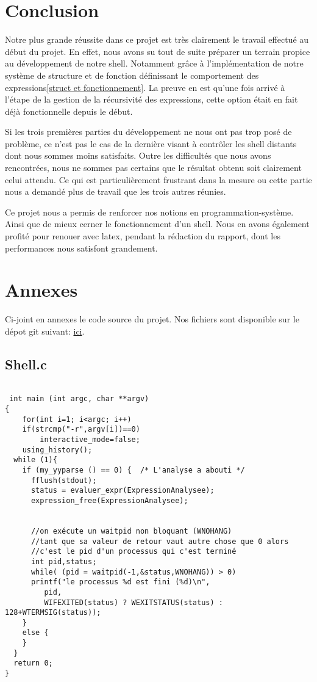 \documentclass[12pt]{article}
\begin{document}
\newpage
\section{Conclusion}

Notre plus grande réussite dans ce projet est très clairement le travail effectué au
début du projet. En effet, nous avons su tout de suite préparer un terrain propice au
développement de notre shell. Notamment grâce à l'implémentation de notre système de structure et 
de fonction définissant le comportement des expressions\ref{struct et fonctionnement}.
La preuve en est qu'une fois arrivé à l'étape de la gestion de la récursivité des expressions, 
cette option était en fait déjà fonctionnelle depuis le début.\newline

Si les trois premières parties du développement ne nous ont pas trop posé de problème, ce n'est pas le cas de la dernière visant à contrôler les shell distants dont nous sommes moins satisfaits. Outre les difficultés que nous avons rencontrées, nous ne sommes pas certains que le résultat obtenu soit clairement celui attendu. Ce qui est particulièrement frustrant dans la mesure ou cette partie nous a demandé plus de travail que les trois autres réunies.\newline

Ce projet nous a permis de renforcer nos notions en programmation-système. Ainsi que de mieux cerner le fonctionnement d'un shell. Nous en avons également profité pour renouer avec latex, pendant la rédaction du rapport, dont les performances nous satisfont grandement.


\newpage
\section{Annexes}

Ci-joint en annexes le code source du projet. Nos fichiers sont disponible sur le dépot git suivant:
 \href{https://github.com/beziarum/shell.git}{ici}.

 \scriptsize
\subsection{Shell.c}
\label{main}
\begin{verbatim}

 int main (int argc, char **argv)
{
    for(int i=1; i<argc; i++)
	if(strcmp("-r",argv[i])==0)
	    interactive_mode=false;
    using_history();
  while (1){
    if (my_yyparse () == 0) {  /* L'analyse a abouti */
      fflush(stdout);
      status = evaluer_expr(ExpressionAnalysee);
      expression_free(ExpressionAnalysee);


      //on exécute un waitpid non bloquant (WNOHANG)
      //tant que sa valeur de retour vaut autre chose que 0 alors
      //c'est le pid d'un processus qui c'est terminé
      int pid,status;
      while( (pid = waitpid(-1,&status,WNOHANG)) > 0)
	  printf("le processus %d est fini (%d)\n",
		 pid,
		 WIFEXITED(status) ? WEXITSTATUS(status) : 128+WTERMSIG(status));
    }
    else {
    }
  }
  return 0;
}
\end{verbatim}
\end{document}
